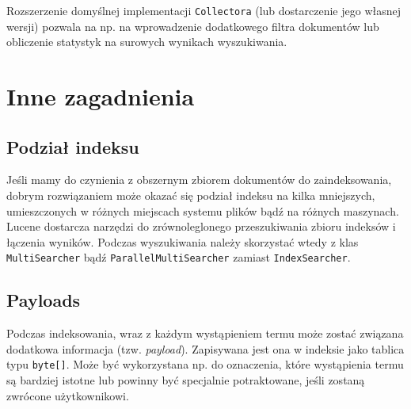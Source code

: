 Rozszerzenie domyślnej implementacji \texttt{Collectora} (lub dostarczenie jego własnej wersji) pozwala na np. na wprowadzenie dodatkowego filtra dokumentów lub obliczenie statystyk na surowych wynikach wyszukiwania.

\section{Inne zagadnienia}

\subsection{Podział indeksu}

Jeśli mamy do czynienia z obszernym zbiorem dokumentów do zaindeksowania, dobrym rozwiązaniem może okazać się podział indeksu na kilka mniejszych, umieszczonych w różnych miejscach systemu plików bądź na różnych maszynach. Lucene dostarcza narzędzi do zrównoleglonego przeszukiwania zbioru indeksów i łączenia wyników. Podczas wyszukiwania należy skorzystać wtedy z klas \texttt{MultiSearcher} bądź \texttt{ParallelMultiSearcher} zamiast \texttt{IndexSearcher}.

\subsection{Payloads}

Podczas indeksowania, wraz z każdym wystąpieniem termu może zostać związana dodatkowa informacja (tzw. \emph{payload}). Zapisywana jest ona w indeksie jako tablica typu \texttt{byte[]}. Może być wykorzystana np. do oznaczenia, które wystąpienia termu są bardziej istotne lub powinny być specjalnie potraktowane, jeśli zostaną zwrócone użytkownikowi.